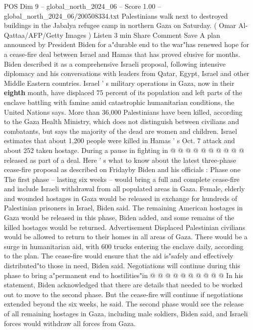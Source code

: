 \begin{textsample}{POS Dim 9 – global\_north\_2024\_06 – Score 1.00 – global\_north\_2024\_06/200508334.txt}  \label{ex:f9_pos_283}
Palestinians walk next to destroyed buildings in the Jabalya refugee camp in northern Gaza on Saturday. ( Omar Al-Qattaa/AFP/Getty Images ) Listen 3 min Share Comment Save A plan announced by President Biden for a"durable end to the war"has renewed hope for a cease-fire deal between Israel and Hamas that has proved elusive for months.
Biden described it as a comprehensive Israeli proposal, following intensive diplomacy and his conversations with leaders from Qatar, Egypt, Israel and other Middle Eastern countries.
Israel ' s military operations in Gaza, now in their \textbf{eighth} month, have displaced 75 percent of its population and left parts of the enclave battling with famine amid catastrophic humanitarian conditions, the United Nations says.
More than 36,000 Palestinians have been killed, according to the Gaza Health Ministry, which does not distinguish between civilians and combatants, but says the majority of the dead are women and children.
Israel estimates that about 1,200 people were killed in Hamas ' s Oct. 7 attack and about 252 taken hostage.
During a pause in fighting in @ @ @ @ @ @ @ @ @ @ released as part of a deal.
Here ' s what to know about the latest three-phase cease-fire proposal as described on Fridayby Biden and his officials : Phase one The first phase -- lasting six weeks -- would bring a full and complete cease-fire and include Israeli withdrawal from all populated areas in Gaza.
Female, elderly and wounded hostages in Gaza would be released in exchange for hundreds of Palestinian prisoners in Israel, Biden said.
The remaining American hostages in Gaza would be released in this phase, Biden added, and some remains of the killed hostages would be returned.
Advertisement Displaced Palestinian civilians would be allowed to return to their homes in all areas of Gaza.
There would be a surge in humanitarian aid, with 600 trucks entering the enclave daily, according to the plan.
The cease-fire would ensure that the aid is"safely and effectively distributed"to those in need, Biden said.
Negotiations will continue during this phase to bring a"permanent end to hostilities"in @ @ @ @ @ @ @ @ @ @ In his statement, Biden acknowledged that there are details that needed to be worked out to move to the second phase.
But the cease-fire will continue if negotiations extended beyond the six weeks, he said.
The second phase would see the release of all remaining hostages in Gaza, including male soldiers, Biden said, and Israeli forces would withdraw all forces from Gaza.

\end{textsample}
